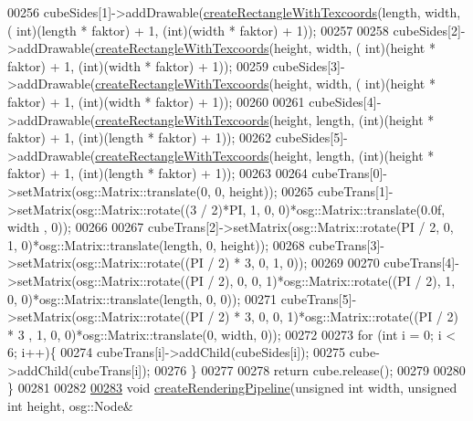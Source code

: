 \begin{DoxyCode}
00256         cubeSides[1]->addDrawable(\hyperlink{namespacebrtr_a4e91424e74398a612c38a920df0577ef}{createRectangleWithTexcoords}(length, width, (\textcolor{keywordtype}{
      int})(length * faktor) + 1, (\textcolor{keywordtype}{int})(width * faktor) + 1));
00257 
00258         cubeSides[2]->addDrawable(\hyperlink{namespacebrtr_a4e91424e74398a612c38a920df0577ef}{createRectangleWithTexcoords}(height, width, (\textcolor{keywordtype}{
      int})(height * faktor) + 1, (\textcolor{keywordtype}{int})(width * faktor) + 1));
00259         cubeSides[3]->addDrawable(\hyperlink{namespacebrtr_a4e91424e74398a612c38a920df0577ef}{createRectangleWithTexcoords}(height, width, (\textcolor{keywordtype}{
      int})(height * faktor) + 1, (\textcolor{keywordtype}{int})(width * faktor) + 1));
00260 
00261         cubeSides[4]->addDrawable(\hyperlink{namespacebrtr_a4e91424e74398a612c38a920df0577ef}{createRectangleWithTexcoords}(height, length, 
      (\textcolor{keywordtype}{int})(height * faktor) + 1, (\textcolor{keywordtype}{int})(length * faktor) + 1));
00262         cubeSides[5]->addDrawable(\hyperlink{namespacebrtr_a4e91424e74398a612c38a920df0577ef}{createRectangleWithTexcoords}(height, length, 
      (\textcolor{keywordtype}{int})(height * faktor) + 1, (\textcolor{keywordtype}{int})(length * faktor) + 1));
00263 
00264         cubeTrans[0]->setMatrix(osg::Matrix::translate(0, 0, height));
00265         cubeTrans[1]->setMatrix(osg::Matrix::rotate((3 / 2)*PI, 1, 0, 0)*osg::Matrix::translate(0.0f, width
      , 0));
00266 
00267         cubeTrans[2]->setMatrix(osg::Matrix::rotate(PI / 2, 0, 1, 0)*osg::Matrix::translate(length, 0, 
      height));
00268         cubeTrans[3]->setMatrix(osg::Matrix::rotate((PI / 2) * 3, 0, 1, 0));
00269 
00270         cubeTrans[4]->setMatrix(osg::Matrix::rotate((PI / 2), 0, 0, 1)*osg::Matrix::rotate((PI / 2), 1, 0, 
      0)*osg::Matrix::translate(length, 0, 0));
00271         cubeTrans[5]->setMatrix(osg::Matrix::rotate((PI / 2) * 3, 0, 0, 1)*osg::Matrix::rotate((PI / 2) * 3
      , 1, 0, 0)*osg::Matrix::translate(0, width, 0));
00272 
00273         \textcolor{keywordflow}{for} (\textcolor{keywordtype}{int} i = 0; i < 6; i++)\{
00274             cubeTrans[i]->addChild(cubeSides[i]);           
00275             cube->addChild(cubeTrans[i]);
00276         \}
00277 
00278         \textcolor{keywordflow}{return} cube.release();
00279 
00280     \}
00281 
00282 
\hypertarget{_util_functions_8cpp_source_l00283}{}\hyperlink{namespacebrtr_a0ecf5882dba499332dc5c6f3c2e819b1}{00283}     \textcolor{keywordtype}{void} \hyperlink{namespacebrtr_a0ecf5882dba499332dc5c6f3c2e819b1}{createRenderingPipeline}(\textcolor{keywordtype}{unsigned} \textcolor{keywordtype}{int} width, \textcolor{keywordtype}{unsigned} \textcolor{keywordtype}{int} height, osg::Node&

\end{DoxyCode}
